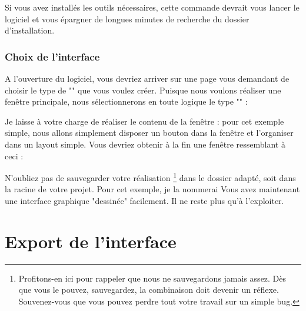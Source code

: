 {Si vous avez installés les outils nécessaires, cette commande devrait vous lancer le logiciel et vous épargner de longues minutes de recherche du dossier d'installation.

\subsubsection{Choix de l'interface}

A l'ouverture du logiciel, vous devriez arriver sur une page vous demandant de choisir le type de "" que vous voulez créer.\newline
Puisque nous voulons réaliser une fenêtre principale, nous sélectionnerons en toute logique le type "" :


Je laisse à votre charge de réaliser le contenu de la fenêtre : pour cet exemple simple, nous allons simplement disposer un bouton dans la fenêtre et l'organiser dans un layout simple.\newline
Vous devriez obtenir à la fin une fenêtre ressemblant à ceci :


N'oubliez pas de sauvegarder votre réalisation
\footnote{Profitons-en ici pour rappeler que nous ne sauvegardons jamais assez. Dès que vous le pouvez, sauvegardez, la combinaison  doit devenir un réflexe. Souvenez-vous que vous pouvez perdre tout votre travail sur un simple bug.}
dans le dossier adapté, soit  dans la racine de votre projet. Pour cet exemple, je la nommerai \newline
Vous avez maintenant une interface graphique "dessinée" facilement. Il ne reste plus qu'à l'exploiter.



\section{Export de l'interface}

}

